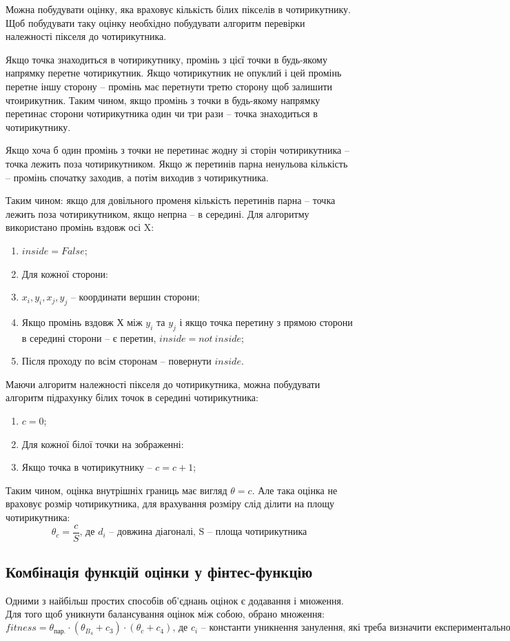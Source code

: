 \documentclass[a4paper,14pt]{report}
\begin{document}
Можна побудувати оцінку, яка враховує кількість білих пікселів в чотирикутнику. Щоб побудувати таку оцінку необхідно побудувати алгоритм перевірки належності пікселя до чотирикутника.

Якщо точка знаходиться в чотирикутнику, промінь з цієї точки в будь-якому напрямку перетне чотирикутник. Якщо чотирикутник не опуклий і цей промінь перетне іншу сторону -- промінь має перетнути третю сторону щоб залишити чтоирикутник.
Таким чином, якщо промінь з точки в будь-якому напрямку перетинає сторони чотирикутника один чи три рази -- точка знаходиться в чотирикутнику.

Якщо хоча б один промінь з точки не перетинає жодну зі сторін чотирикутника -- точка лежить поза чотирикутником. Якщо ж перетинів парна ненульова кількість -- промінь спочатку заходив, а потім виходив з чотирикутника.

Таким чином: якщо для довільного променя кількість перетинів парна -- точка лежить поза чотирикутником, якщо непрна -- в середині. Для алгоритму використано промінь вздовж осі X:
\begin{enumerate}
  \item $inside = False$;
  \item Для кожної сторони:
  \item $x_i, y_i, x_j, y_j$ -- координати вершин сторони;
  \item Якщо промінь вздовж Х між $y_i$ та $y_j$ і якщо точка перетину з прямою сторони в середині сторони -- є перетин, $inside = not\ inside$;
  \item Після проходу по всім сторонам -- повернути $inside$.
\end{enumerate}

Маючи алгоритм належності пікселя до чотирикутника, можна побудувати алгоритм підрахунку білих точок в середині чотирикутника:
\begin{enumerate}
  \item $c = 0$;
  \item Для кожної білої точки на зображенні:
  \item Якщо точка в чотирикутнику -- $c = c+1$;
\end{enumerate}

Таким чином, оцінка внутрішніх границь має вигляд $\theta = c$. 
Але така оцінка не враховує розмір чотирикутника, для врахування розміру слід ділити на площу чотирикутника:
\[
\theta_c = \frac{c}{S}\text{, де $d_i$ -- довжина діагоналі, S -- площа чотирикутника}
\]

\subsection{Комбінація функцій оцінки у фінтес-функцію}
Одними з найбільш простих способів об'єднань оцінок є додавання і множення. 
Для того щоб уникнути балансування оцінок між собою, обрано множення:
\[
fitness = \theta_\text{пар.}\cdot (\theta_{B_4}+c_3)\cdot (\theta_c + c_4)\text{, де $c_i$ -- константи уникнення занулення, які треба визначити експериментально}
\]
\end{document}
